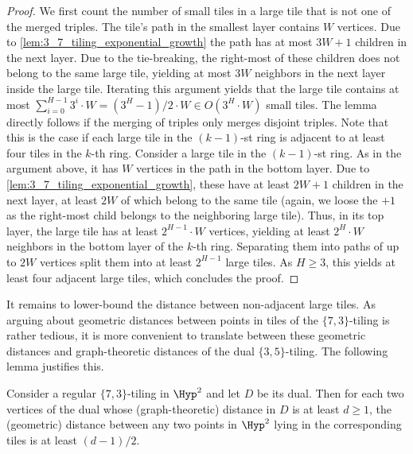 \begin{proof}
    We first count the number of small tiles in a large tile that is not one of the merged triples.
    The tile's path in the smallest layer contains $W$ vertices.
    Due to \cref{lem:3_7_tiling_exponential_growth} the path has at most $3W + 1$ children in the next layer.
    Due to the tie-breaking, the right-most of these children does not belong to the same large tile, yielding at most $3W$ neighbors in the next layer inside the large tile.
    Iterating this argument yields that the large tile contains at most $\sum_{i = 0}^{H - 1} 3^i \cdot W = (3^H - 1) / 2 \cdot W \in O(3^H \cdot W)$ small tiles.
%
    The lemma directly follows if the merging of triples only merges disjoint triples.
    Note that this is the case if each large tile in the $(k - 1)$-st ring is adjacent to at least four tiles in the $k$-th ring.
    Consider a large tile in the $(k - 1)$-st ring.
    As in the argument above, it has $W$ vertices in the path in the bottom layer.
    Due to \cref{lem:3_7_tiling_exponential_growth}, these have at least $2W + 1$ children in the next layer, at least $2W$ of which belong to the same tile (again, we loose the $+1$ as the right-most child belongs to the neighboring large tile).
    Thus, in its top layer, the large tile has at least $2^{H - 1}\cdot W$ vertices, yielding at least $2^H \cdot W$ neighbors in the bottom layer of the $k$-th ring.
    Separating them into paths of up to $2W$ vertices split them into at least $2^{H - 1}$ large tiles.
    As $H \ge 3$, this yields at least four adjacent large tiles, which concludes the proof.
\end{proof}
%
It remains to lower-bound the distance between non-adjacent large tiles.
As arguing about geometric distances between points in tiles of the $\{7, 3\}$-tiling is rather tedious, it is more convenient to translate between these geometric distances and graph-theoretic distances of the dual $\{3, 5\}$-tiling.
The following lemma justifies this.
%
\begin{lemma}\label{lem:geometric_graph_distances}
    Consider a regular $ \{ 7, 3 \} $-tiling in $ \Hyp^2 $ and let $ D $ be its dual.
    Then for each two vertices of the dual whose (graph-theoretic) distance in $ D $ is at least $d \geq 1 $, the (geometric) distance between any two points in $ \Hyp^2 $ lying in the corresponding tiles is at least $ (d - 1) / 2 $.
\end{lemma}
